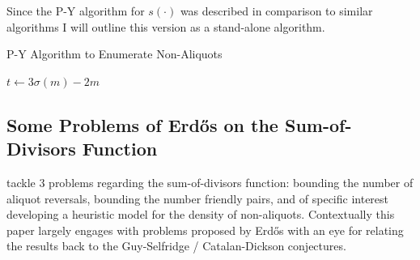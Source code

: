\documentclass{article}
\theoremstyle{definition}
\begin{document}
Since the P-Y algorithm for $s(\cdot)$ was described in comparison to similar algorithms I will outline this version as a stand-alone algorithm.
\begin{algorithm}[H]
\caption{P-Y Algorithm to Enumerate Non-Aliquots} 
\begin{algorithmic}[1]
            \State $t \gets 3\sigma(m) - 2m$
            \EndWhile
        \EndIf
         
        \EndIf
    \EndFor
    \ForAll{odd composite $m \in [1, x^{2/3})$}
        \EndIf
    \EndFor
    \EndProcedure
\end{algorithmic}
\end{algorithm} 
%
\subsection{Some Problems of Erdős on the Sum-of-Divisors Function}
%
\cite{pollPom} tackle 3 problems regarding the sum-of-divisors function: bounding the number of aliquot reversals, bounding the number friendly pairs, and of specific interest developing a heuristic model for the density of non-aliquots. Contextually this paper largely engages with problems proposed by Erdős with an eye for relating the results back to the Guy-Selfridge / Catalan-Dickson conjectures.
\end{document}
